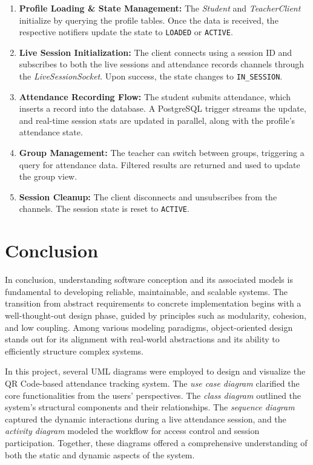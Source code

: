 \documentclass[12pt,a4paper]{report}
\begin{document}
\begin{enumerate}
    \item \textbf{Profile Loading \& State Management:}  
    The \textit{Student} and \textit{TeacherClient} initialize by querying the profile tables. Once the data is received, the respective notifiers update the state to \texttt{LOADED} or \texttt{ACTIVE}.
    
    \item \textbf{Live Session Initialization:}  
    The client connects using a session ID and subscribes to both the live sessions and attendance records channels through the \textit{LiveSessionSocket}. Upon success, the state changes to \texttt{IN\_SESSION}.
    
    \item \textbf{Attendance Recording Flow:}  
    The student submits attendance, which inserts a record into the database. A PostgreSQL trigger streams the update, and real-time session stats are updated in parallel, along with the profile's attendance state.
    
    \item \textbf{Group Management:}  
    The teacher can switch between groups, triggering a query for attendance data. Filtered results are returned and used to update the group view.
    
    \item \textbf{Session Cleanup:}  
    The client disconnects and unsubscribes from the channels. The session state is reset to \texttt{ACTIVE}.
\end{enumerate}


\section{Conclusion}

In conclusion, understanding software conception and its associated models is fundamental to developing reliable, maintainable, and scalable systems. The transition from abstract requirements to concrete implementation begins with a well-thought-out design phase, guided by principles such as modularity, cohesion, and low coupling. Among various modeling paradigms, object-oriented design stands out for its alignment with real-world abstractions and its ability to efficiently structure complex systems.

In this project, several UML diagrams were employed to design and visualize the QR Code-based attendance tracking system. The \textit{use case diagram} clarified the core functionalities from the users’ perspectives. The \textit{class diagram} outlined the system's structural components and their relationships. The \textit{sequence diagram} captured the dynamic interactions during a live attendance session, and the \textit{activity diagram} modeled the workflow for access control and session participation. Together, these diagrams offered a comprehensive understanding of both the static and dynamic aspects of the system.
\end{document}
